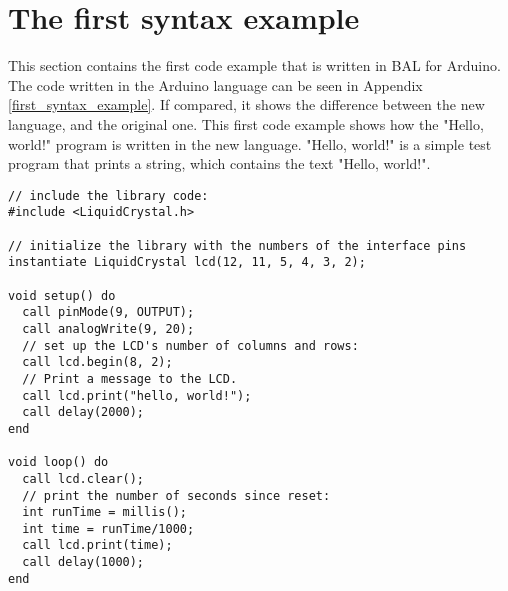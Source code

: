 \section{The first syntax example}\label{sec:code_examples}
This section contains the first code example that is written in BAL for Arduino. The code written in the Arduino language can be seen in Appendix \ref{first_syntax_example}. If compared, it shows the difference between the new language, and the original one. This first code example shows how the "Hello, world!" program is written in the new language. "Hello, world!" is a simple test program that prints a string, which contains the text "Hello, world!".
 
\begin{lstlisting}[caption=Hello World code example based on the source language, label=lst:syntax1]
// include the library code:
#include <LiquidCrystal.h>

// initialize the library with the numbers of the interface pins
instantiate LiquidCrystal lcd(12, 11, 5, 4, 3, 2);

void setup() do
  call pinMode(9, OUTPUT);
  call analogWrite(9, 20);
  // set up the LCD's number of columns and rows: 
  call lcd.begin(8, 2);
  // Print a message to the LCD.
  call lcd.print("hello, world!");
  call delay(2000);
end

void loop() do
  call lcd.clear();
  // print the number of seconds since reset:
  int runTime = millis();
  int time = runTime/1000;
  call lcd.print(time);
  call delay(1000);
end
\end{lstlisting}
